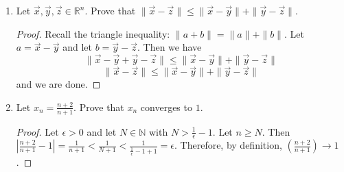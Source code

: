 \documentclass[12pt]{article}
\newcommand{\R}{\mathbb{R}}
\newcommand{\N}{\mathbb{N}}
\begin{document}
\begin{enumerate}
\begin{enumerate}
\begin{proof}
Case 2: $x < 0$. So, 
$$-x > 0$$ 
$$-x \cdot -x > 0 \cdot -x$$ 
$$x^2 > 0$$ 
and we are done. 
\end{proof}
\item For all $w, x, y, z\in X$, if $w\leq x$ and $y\leq z$, then $w+y\leq x+z$.
\begin{proof}
If $w\leq x$ and $y\leq z$, then we have $z-y \geq 0$ and $x-w \geq 0$. Rearranging, we get $w-x \leq 0$ and $z - y \geq 0$. Thus, it follows that 
$$z-y \geq w-x$$
$$z \geq w - x + y$$
$$z + x \geq w+y$$
Thus, $w+y\leq x+z$.
and we are done. 
\end{proof}
\item For all $x, y, z\in X$, if $x\geq 0$ and $y\leq z$, then $xy\leq xz$.
\begin{proof}
Since $x \geq 0$ and $y \leq z$ then $y-z \leq 0$. So, 
$$x \cdot (y-z) \leq 0 $$
$$xy - xz \leq 0 $$
$$xy \leq xz $$
and we are done. 
\end{proof}
\item For all $x, y, z\in X$, if $x\leq 0$ and $y\leq z$, then $xy\geq xz$.
\begin{proof}
Since $x\leq 0$ and $y\leq z$, then $y-z \leq 0$. Then since $x\leq 0$, we have two negative numbers and thus
$$x \cdot (y-z) \geq 0 \cdot x$$
$$xy- xz \geq 0$$
$$xy \geq xz$$
 and we are done. 
\end{proof}
\end{enumerate}

\item Let $\vec{x}, \vec{y}, \vec{z}\in \R^n$. Prove that $\|\vec{x}-\vec{z}\|\leq \|\vec{x}-\vec{y}\|+\|\vec{y}-\vec{z}\|$.

\begin{proof}
Recall the triangle inequality: $\|a + b\| = \|a\| + \|b\|$. Let $a = \vec{x} - \vec{y}$ and let $b= \vec{y} - \vec{z}$. Then we have $$\|\vec{x}-\vec{y} + \vec{y} - \vec{z}\|\leq \|\vec{x}-\vec{y}\|+\|\vec{y}-\vec{z}\|$$ $$\|\vec{x}-\vec{z}\|\leq \|\vec{x}-\vec{y}\|+\|\vec{y}-\vec{z}\|$$ and we are done.  

\end{proof}

\item Let $x_n = \frac{n+2}{n+1}$. Prove that $x_n$ converges to $1$.

\begin{proof}
Let $\epsilon > 0$ and let $N \in \N$ with $N > \frac{1}{\epsilon} - 1$. Let $n \geq N$. Then $|\frac{n+2}{n+1} - 1| = \frac{1}{n+1} < \frac{1}{N + 1} < \frac{1}{\frac{1}{\epsilon} - 1 + 1} = \epsilon$. Therefore, by definition, $(\frac{n+2}{n+1}) \to 1$.
\end{proof}


\end{enumerate}
\end{document}
